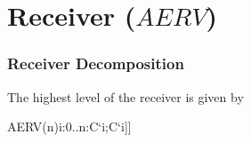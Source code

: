 \documentclass{article}
\begin{document}
\part{Receiver ($AERV$)}

\section{Receiver Decomposition}

The highest level of the receiver is given by

\begin{csp}
AERV(n)\equiv*[[\langle[]i:0..n:C`i;C`i]]
\end{csp}
\end{document}
